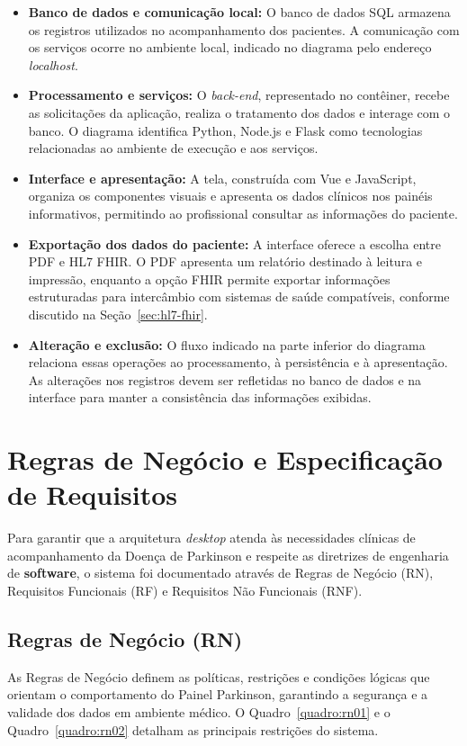 \begin{itemize}
    \item \textbf{Banco de dados e comunicação local:} O banco de dados SQL armazena os registros utilizados no acompanhamento dos pacientes. A comunicação com os serviços ocorre no ambiente local, indicado no diagrama pelo endereço \textit{localhost}.

    \item \textbf{Processamento e serviços:} O \textit{back-end}, representado no contêiner, recebe as solicitações da aplicação, realiza o tratamento dos dados e interage com o banco. O diagrama identifica Python, Node.js e Flask como tecnologias relacionadas ao ambiente de execução e aos serviços.

    \item \textbf{Interface e apresentação:} A tela, construída com Vue e JavaScript, organiza os componentes visuais e apresenta os dados clínicos nos painéis informativos, permitindo ao profissional consultar as informações do paciente.

    \item \textbf{Exportação dos dados do paciente:} A interface oferece a escolha entre PDF e HL7 FHIR. O PDF apresenta um relatório destinado à leitura e impressão, enquanto a opção FHIR permite exportar informações estruturadas para intercâmbio com sistemas de saúde compatíveis, conforme discutido na Seção~\ref{sec:hl7-fhir}.

    \item \textbf{Alteração e exclusão:} O fluxo indicado na parte inferior do diagrama relaciona essas operações ao processamento, à persistência e à apresentação. As alterações nos registros devem ser refletidas no banco de dados e na interface para manter a consistência das informações exibidas.
\end{itemize}

\section{Regras de Negócio e Especificação de Requisitos}
\label{sec:requisitos_regras}

Para garantir que a arquitetura \textit{desktop} atenda às necessidades clínicas de acompanhamento da Doença de Parkinson e respeite as diretrizes de engenharia de \textbf{software}, o sistema foi documentado através de Regras de Negócio (RN), Requisitos Funcionais (RF) e Requisitos Não Funcionais (RNF).

\subsection{Regras de Negócio (RN)}
As Regras de Negócio definem as políticas, restrições e condições lógicas que orientam o comportamento do Painel Parkinson, garantindo a segurança e a validade dos dados em ambiente médico. O Quadro~\ref{quadro:rn01} e o Quadro~\ref{quadro:rn02} detalham as principais restrições do sistema.

